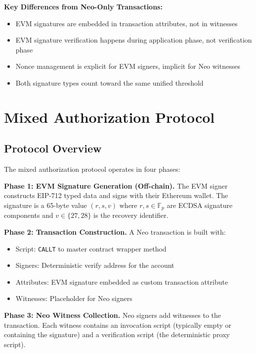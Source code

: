 \documentclass[10pt,twocolumn]{article}
\newcommand{\code}[1]{\texttt{\small #1}}
\begin{document}
{\textbf{Key Differences from Neo-Only Transactions:}

\begin{itemize}[leftmargin=*,topsep=2pt,itemsep=1pt]
\item EVM signatures are embedded in transaction attributes, not in witnesses
\item EVM signature verification happens during application phase, not verification phase
\item Nonce management is explicit for EVM signers, implicit for Neo witnesses
\item Both signature types count toward the same unified threshold
\end{itemize}

\section{Mixed Authorization Protocol}

\subsection{Protocol Overview}

The mixed authorization protocol operates in four phases:

\textbf{Phase 1: EVM Signature Generation (Off-chain).} The EVM signer constructs EIP-712 typed data and signs with their Ethereum wallet. The signature is a 65-byte value $(r, s, v)$ where $r, s \in \mathbb{F}_p$ are ECDSA signature components and $v \in \{27, 28\}$ is the recovery identifier.

\textbf{Phase 2: Transaction Construction.} A Neo transaction is built with:
\begin{itemize}[leftmargin=*,topsep=2pt,itemsep=1pt]
\item Script: \code{CALLT} to master contract wrapper method
\item Signers: Deterministic verify address for the account
\item Attributes: EVM signature embedded as custom transaction attribute
\item Witnesses: Placeholder for Neo signers
\end{itemize}

\textbf{Phase 3: Neo Witness Collection.} Neo signers add witnesses to the transaction. Each witness contains an invocation script (typically empty or containing the signature) and a verification script (the deterministic proxy script).

}
\end{document}
